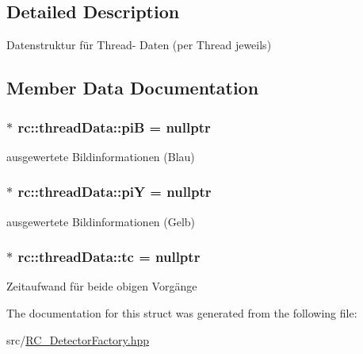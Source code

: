 \subsection{Detailed Description}
Datenstruktur für Thread-\/ Daten (per Thread jeweils) 

\subsection{Member Data Documentation}
\hypertarget{structrc_1_1threadData_a4b48cf230bc69addbccefa286ed602bc}{
\subsubsection[{pi\+B}]{$\ast$ rc\+::thread\+Data\+::pi\+B = nullptr}}\label{structrc_1_1threadData_a4b48cf230bc69addbccefa286ed602bc}
ausgewertete Bildinformationen (Blau) \hypertarget{structrc_1_1threadData_ae2a160f5aad8948d708241ba66202608}{
\subsubsection[{pi\+Y}]{$\ast$ rc\+::thread\+Data\+::pi\+Y = nullptr}}\label{structrc_1_1threadData_ae2a160f5aad8948d708241ba66202608}
ausgewertete Bildinformationen (Gelb) \hypertarget{structrc_1_1threadData_a756f72bb5d718eb389829cb6a72cf575}{
\subsubsection[{tc}]{$\ast$ rc\+::thread\+Data\+::tc = nullptr}}\label{structrc_1_1threadData_a756f72bb5d718eb389829cb6a72cf575}
Zeitaufwand für beide obigen Vorgänge 

The documentation for this struct was generated from the following file\+:\begin{DoxyCompactItemize}
\item 
src/\hyperlink{RC__DetectorFactory_8hpp}{R\+C\+\_\+\+Detector\+Factory.\+hpp}\end{DoxyCompactItemize}
